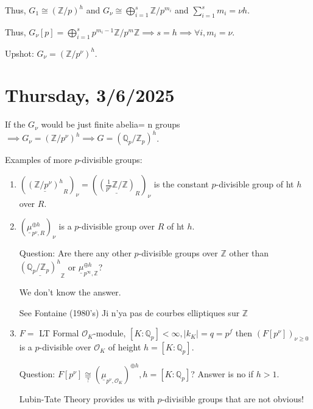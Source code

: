 \documentclass{article}
\theoremstyle{definition}
\numberwithin{theorem}{subsection}
\begin{document}
    Thus, \(G_1 \cong (\mathbb{Z} / p)^h\) and \(G_\nu \cong \bigoplus_{i=1}^s \mathbb{Z} / p^{m_i}\) and \(\sum_{i=1}^s m_i = \nu h\).

    Thus, \(G_\nu[p] = \bigoplus_{i=1}^s p^{m_i - 1} \mathbb{Z} / p^m \mathbb{Z}  \implies s = h \implies \forall i, m_i = \nu.\)

    Upshot: \(G_\nu = (\mathbb{Z} / p^\nu)^h\).

    \section*{Thursday, 3/6/2025}
    
    If the \(G_\nu\) would be just finite abelia= n groups \(\implies G_\nu = (\mathbb{Z} / p^\nu)^h \implies G = (\mathbb{Q}_p / \mathbb{Z}_p)^h\).
    
    Examples of more \(p\)-divisible groups:

    \begin{enumerate}[label=\arabic*)]
        \item \((\underline{(\mathbb{Z} / p^\nu)^h}_R)_\nu = \left( \underline{\left( \frac{1}{p^\nu}\mathbb{Z} / \mathbb{Z} \right)}_R \right)_\nu \) is the constant \(p\)-divisible group of ht \(h\) over \(R\).
        \item \((\underline{\mu}_{p^\nu, R}^{\oplus h})_\nu\) is a \(p\)-divisible group over \(R\) of ht \(h\).
        
        Question: Are there any other \(p\)-divisible groups over \(\mathbb{Z}\) other than \(\underline{(\mathbb{Q}_p / \mathbb{Z}_p)^h}_\mathbb{Z}\) or \(\underline{\mu}_{p^{\infty} , \mathbb{Z}}^{\oplus h}\)?
    
        We don't know the answer.

        See Fontaine (1980's) Ji n'ya pas de courbes elliptiques sur \(\mathbb{Z}\)

        \item \(F =\) LT Formal \(\mathcal{O}_K\)-module, \([K:\mathbb{Q}_p] < \infty , \vert k_K \vert = q = p^f\) then \((F[p^\nu])_{\nu\geq 0}\) is a \(p\)-divisible over \(\mathcal{O}_K\) of height \(h = [K:\mathbb{Q}_p]\).
        
        Question: \(F[p^\nu] \underset{?}{\cong} (\underline{\mu}_{p^\nu, \mathcal{O}_K})^{\oplus h}, h = [K:\mathbb{Q}_p]\)? Answer is no if \(h > 1\). 

        Lubin-Tate Theory provides us with \(p\)-divisible groups that are not obvious!
    \end{enumerate}
\end{document}
